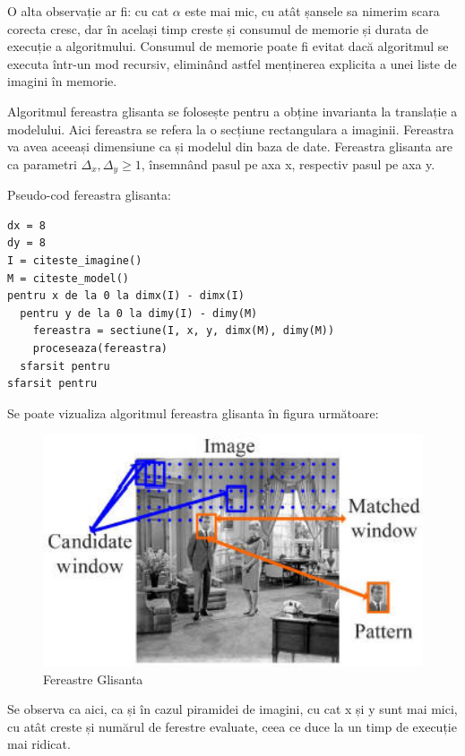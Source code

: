 O alta observație ar fi: cu cat ${\alpha}$ este mai mic, cu atât șansele sa nimerim scara corecta cresc, dar în același timp creste și consumul de memorie și durata de execuție a algoritmului.
Consumul de memorie poate fi evitat dacă algoritmul se executa într-un mod recursiv, eliminând astfel menținerea explicita a unei liste de imagini în memorie.

Algoritmul fereastra glisanta se folosește pentru a obține invarianta la translație a modelului.
Aici fereastra se refera la o secțiune rectangulara a imaginii.
Fereastra va avea aceeași dimensiune ca și modelul din baza de date.
Fereastra glisanta are ca parametri ${\Delta_x, \Delta_y \geq 1}$, însemnând pasul pe axa x, respectiv pasul pe axa y.

Pseudo-cod fereastra glisanta:
\begin{mdframed}
\begin{verbatim}
dx = 8
dy = 8
I = citeste_imagine()
M = citeste_model()
pentru x de la 0 la dimx(I) - dimx(I)
  pentru y de la 0 la dimy(I) - dimy(M)
    fereastra = sectiune(I, x, y, dimx(M), dimy(M))
    proceseaza(fereastra)
  sfarsit pentru
sfarsit pentru
\end{verbatim}
\end{mdframed}

Se poate vizualiza algoritmul fereastra glisanta în figura următoare:
\begin{figure}[H]
	\centering
		\includegraphics[width=1.00\textwidth]{imagini/sliding_window.png}
	\caption{Fereastre Glisanta\protect\footnotemark}
	\label{fig:sliding_window}
\end{figure}


Se observa ca aici, ca și în cazul piramidei de imagini, cu cat x și y sunt mai mici, cu atât creste și numărul de ferestre evaluate, ceea ce duce la un timp de execuție mai ridicat.

